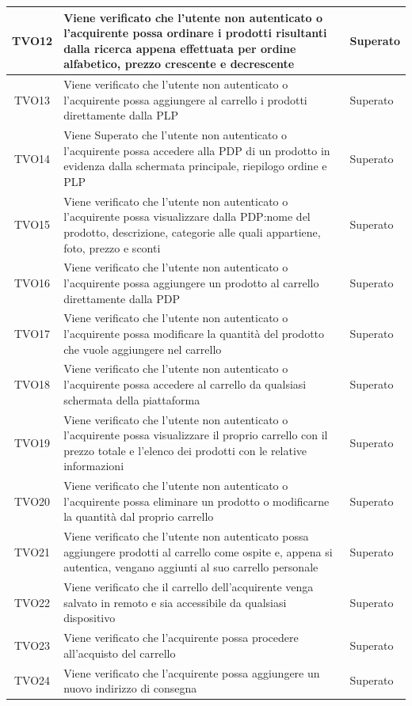 \begin{longtable}{|c| C{10cm} |C{3cm}|}
	TVO12 & Viene verificato che l'utente non autenticato o l'acquirente possa ordinare i prodotti risultanti dalla ricerca appena effettuata per ordine alfabetico, prezzo crescente e decrescente & Superato \\ \hline
	TVO13 & Viene verificato che l'utente non autenticato o l'acquirente possa aggiungere al carrello i prodotti direttamente dalla PLP & Superato\\ \hline
	TVO14 & Viene Superato che l'utente non autenticato o l'acquirente possa accedere alla PDP di un prodotto in evidenza dalla schermata principale, riepilogo ordine e PLP & Superato \\ \hline
	TVO15 & Viene verificato che l'utente non autenticato o l'acquirente possa visualizzare dalla PDP:nome del prodotto, descrizione, categorie alle quali appartiene, foto, prezzo e sconti & Superato \\ \hline
	TVO16 & Viene verificato che l'utente non autenticato o l'acquirente possa aggiungere un prodotto al carrello direttamente dalla PDP  & Superato\\ \hline
	TVO17 & Viene verificato che l'utente non autenticato o l'acquirente possa modificare la quantità del prodotto che vuole aggiungere nel carrello & Superato\\ \hline
	TVO18 & Viene verificato che l'utente non autenticato o l'acquirente possa accedere al carrello da qualsiasi schermata della piattaforma & Superato \\ \hline
	TVO19 & Viene verificato che l'utente non autenticato o l'acquirente possa visualizzare il proprio carrello con il prezzo totale e l'elenco dei prodotti con le relative informazioni & Superato\\ \hline
	TVO20 & Viene verificato che l'utente non autenticato o l'acquirente possa eliminare un prodotto o modificarne la quantità dal proprio carrello & Superato\\ \hline
	TVO21 & Viene verificato che l'utente non autenticato possa aggiungere prodotti al carrello come ospite e, appena si autentica, vengano aggiunti al suo carrello personale & Superato\\ \hline
	TVO22 & Viene verificato che il carrello dell'acquirente venga salvato in remoto e sia accessibile da qualsiasi dispositivo & Superato\\ \hline
	TVO23 & Viene verificato che l'acquirente possa procedere all'acquisto del carrello & Superato\\ \hline
	TVO24 & Viene verificato che l'acquirente possa aggiungere un nuovo indirizzo di consegna & Superato\\ \hline

\end{longtable}
